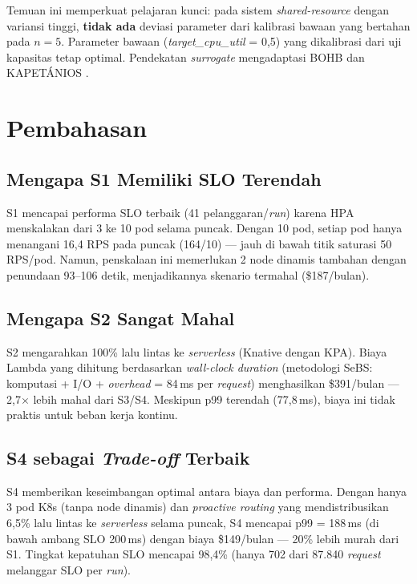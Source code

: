 Temuan ini memperkuat pelajaran kunci: pada sistem \emph{shared-resource} dengan variansi tinggi, \textbf{tidak ada} deviasi parameter dari kalibrasi bawaan yang bertahan pada $n=5$. Parameter bawaan (\emph{target\_cpu\_util} = 0,5) yang dikalibrasi dari uji kapasitas tetap optimal. Pendekatan \emph{surrogate} mengadaptasi BOHB \citep{falkner2018bohb} dan KAPETÁNIOS \citep{kapetanios2022}.

\section{Pembahasan}
\label{sec:discussion}

\subsection{Mengapa S1 Memiliki SLO Terendah}

S1 mencapai performa SLO terbaik (41 pelanggaran/\emph{run}) karena HPA menskalakan dari 3 ke 10 pod selama puncak. Dengan 10 pod, setiap pod hanya menangani 16,4 RPS pada puncak (164/10) — jauh di bawah titik saturasi 50 RPS/pod. Namun, penskalaan ini memerlukan 2 node dinamis tambahan dengan penundaan 93--106 detik, menjadikannya skenario termahal (\$187/bulan).

\subsection{Mengapa S2 Sangat Mahal}

S2 mengarahkan 100\% lalu lintas ke \emph{serverless} (Knative dengan KPA). Biaya Lambda yang dihitung berdasarkan \emph{wall-clock duration} (metodologi SeBS: komputasi + I/O + \emph{overhead} = 84\,ms per \emph{request}) menghasilkan \$391/bulan — 2,7$\times$ lebih mahal dari S3/S4. Meskipun p99 terendah (77,8\,ms), biaya ini tidak praktis untuk beban kerja kontinu.

\subsection{S4 sebagai \emph{Trade-off} Terbaik}

S4 memberikan keseimbangan optimal antara biaya dan performa. Dengan hanya 3 pod K8s (tanpa node dinamis) dan \emph{proactive routing} yang mendistribusikan 6,5\% lalu lintas ke \emph{serverless} selama puncak, S4 mencapai p99 = 188\,ms (di bawah ambang SLO 200\,ms) dengan biaya \$149/bulan — 20\% lebih murah dari S1. Tingkat kepatuhan SLO mencapai 98,4\% (hanya 702 dari 87.840 \emph{request} melanggar SLO per \emph{run}).

